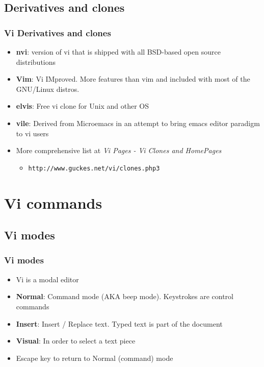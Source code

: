 \documentclass{beamer}
\begin{document}
\subsection{Derivatives and clones}
\begin{frame}
\frametitle{Vi Derivatives and clones}

\begin{itemize}
\item \textbf{nvi}: version of vi that is shipped with all BSD-based open source distributions
\item \textbf{Vim}: Vi IMproved. More features than vim and included with most of the GNU/Linux distros.
\item \textbf{elvis}: Free vi clone for Unix and other OS
\item \textbf{vile}: Derived from Microemacs in an attempt to bring emacs editor paradigm to vi users
\item More comprehensive list at \textit{Vi Pages - Vi Clones and HomePages}
  \begin{itemize}
  \item \texttt{http://www.guckes.net/vi/clones.php3}
  \end{itemize}
\end{itemize}

\end{frame}



\section{Vi commands}

\subsection{Vi modes}

\begin{frame}
\frametitle{Vi modes}

\begin{itemize}
\item Vi is a modal editor
\item \textbf{Normal}: Command mode (AKA beep mode). Keystrokes are control commands
\item \textbf{Insert}: Insert / Replace text. Typed text is part of the document
\item \textbf{Visual}: In order to select a text piece
\item Escape key to return to Normal (command) mode
\end{itemize}

\end{frame}
\end{document}
